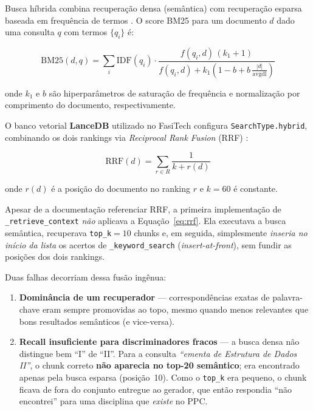 \documentclass[12pt,a4paper]{report}
\begin{document}
Busca híbrida combina recuperação densa (semântica) com recuperação esparsa
baseada em frequência de termos \autocite{robertson1994okapi}.
O score BM25 para um documento $d$ dado uma consulta $q$ com termos $\{q_i\}$ é:

\begin{equation}
  \text{BM25}(d,q) = \sum_{i} \text{IDF}(q_i) \cdot
  \frac{f(q_i,d)\,(k_1+1)}{f(q_i,d) + k_1\!\left(1 - b + b\,\frac{|d|}{\text{avgdl}}\right)}
  \label{eq:bm25}
\end{equation}

onde $k_1$ e $b$ são hiperparâmetros de saturação de frequência e normalização
por comprimento do documento, respectivamente.

O banco vetorial \textbf{LanceDB} utilizado no FasiTech configura
\texttt{SearchType.hybrid}, combinando os dois rankings via
\textit{Reciprocal Rank Fusion} (RRF) \autocite{cormack2009rrf}:

\begin{equation}
  \text{RRF}(d) = \sum_{r \in R} \frac{1}{k + r(d)}
  \label{eq:rrf}
\end{equation}

onde $r(d)$ é a posição do documento no ranking $r$ e $k=60$ é constante.

\begin{historico}
Apesar de a documentação referenciar RRF, a primeira implementação de
\texttt{\_retrieve\_context} \emph{não} aplicava a Equação~\eqref{eq:rrf}.
Ela executava a busca semântica, recuperava \texttt{top\_k}$=10$ chunks e, em
seguida, simplesmente \emph{inseria no início da lista} os acertos de
\texttt{\_keyword\_search} (\textit{insert-at-front}), sem fundir as posições
dos dois rankings.
\end{historico}

\begin{problema}
Duas falhas decorriam dessa fusão ingênua:
\begin{enumerate}
  \item \textbf{Dominância de um recuperador} — correspondências exatas de
        palavra-chave eram sempre promovidas ao topo, mesmo quando menos
        relevantes que bons resultados semânticos (e vice-versa).
  \item \textbf{Recall insuficiente para discriminadores fracos} — a busca
        densa não distingue bem ``I'' de ``II''. Para a consulta
        \textit{``ementa de Estrutura de Dados II''}, o chunk correto
        \textbf{não aparecia no top-20 semântico}; era encontrado apenas pela
        busca esparsa (posição~10). Como o \texttt{top\_k} era pequeno, o chunk
        ficava de fora do conjunto entregue ao gerador, que então respondia
        ``não encontrei'' para uma disciplina que \emph{existe} no PPC.
\end{enumerate}
\end{problema}
\end{document}
